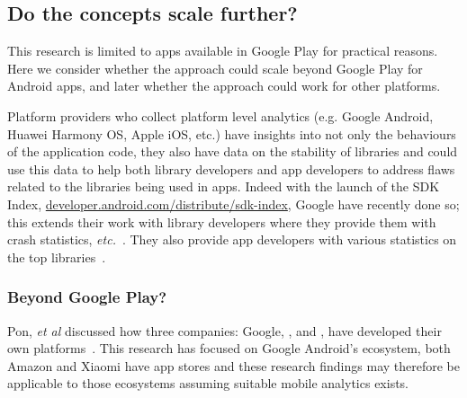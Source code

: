 \subsection{Do the concepts scale further?}
This research is limited to apps available in Google Play for practical reasons. Here we consider whether the approach could scale beyond Google Play for Android apps, and later whether the approach could work for other platforms.

Platform providers who collect platform level analytics (e.g. Google Android, Huawei Harmony OS, Apple iOS, etc.) have insights into not only the behaviours of the application code, they also have data on the stability of libraries and could use this data to help both library developers and app developers to address flaws related to the libraries being used in apps. Indeed with the launch of the SDK Index, \href{https://developer.android.com/distribute/sdk-index}{developer.android.com/distribute/sdk-index}, Google have recently done so; this extends their work with library developers where they provide them with crash statistics, \emph{etc.}~. They also provide app developers with various statistics on the top libraries~.

\subsubsection{Beyond Google Play?}

Pon, \emph{et al} discussed how three companies: Google, , and , have developed their own platforms~. 
This research has focused on Google Android's ecosystem, both Amazon and Xiaomi have app stores and these research findings may therefore be applicable to those ecosystems assuming suitable mobile analytics exists. 


